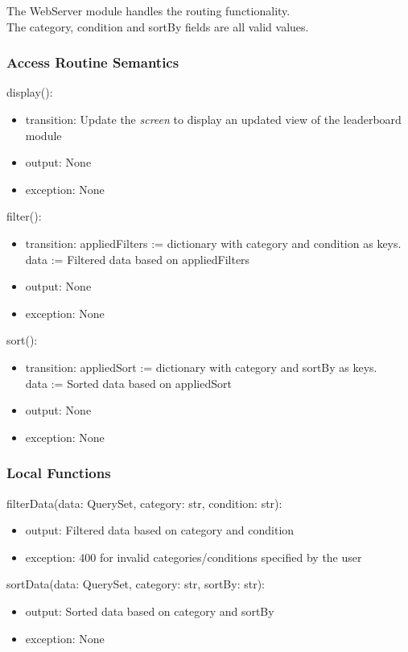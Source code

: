 \documentclass[12pt, titlepage]{article}
\begin{document}
The WebServer module handles the routing functionality. \\
The category, condition and sortBy fields are all valid values.

\subsubsection{Access Routine Semantics}

\noindent display():
\begin{itemize}
\item transition: Update the \textit{screen} to display an updated view of the leaderboard module
\item output: None
\item exception: None
\end{itemize}

\noindent filter():
\begin{itemize}
\item transition: appliedFilters := dictionary with category and condition as keys. \\
data := Filtered data based on appliedFilters
\item output: None
\item exception: None
\end{itemize}

\noindent sort():
\begin{itemize}
\item transition: appliedSort := dictionary with category and sortBy as keys. \\
data := Sorted data based on appliedSort
\item output: None
\item exception: None
\end{itemize}

\subsubsection{Local Functions}

\noindent filterData(data: QuerySet, category: str, condition: str):
\begin{itemize}
\item output: Filtered data based on category and condition
\item exception: 400 for invalid categories/conditions specified by the user
\end{itemize}

\noindent sortData(data: QuerySet, category: str, sortBy: str):
\begin{itemize}
\item output: Sorted data based on category and sortBy
\item exception: None
\end{itemize}
\end{document}
